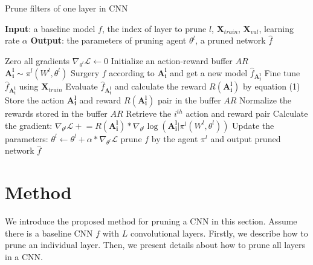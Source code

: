 \documentclass[10pt,twocolumn,letterpaper]{article}
\begin{document}
\begin{algorithm}[!ht]
  \caption{Prune filters of one layer in CNN}\label{algo1}
  \begin{algorithmic}
    
  \State \textbf{Input}: a baseline model $f$, the index of layer to prune $l$, $\mathbf{X}_{train}$, $\mathbf{X}_{val}$, learning rate $\alpha$
  \State \textbf{Output}: the parameters of pruning agent $\theta^l$, a pruned network $\hat{f}$
  
           \State Zero all gradients $\nabla_{\theta^l}\mathcal{L} \leftarrow 0 $
           \State Initialize an action-reward buffer $AR$
                                                                                   
               \State $\mathbf{A_i^l}  \sim \pi^l(W^l, \theta^l)$                                       
               \State Surgery $f$ according to $\mathbf{A_i^l} $ and get a new model $\hat{f}_{\mathbf{A_i^l} }$                 
               \State Fine tune $\hat{f}_{\mathbf{A_i^l} }$  using $\mathbf{X}_{train}$
               \State Evaluate $\hat{f}_{\mathbf{A_i^l} }$ and calculate the reward $R(\mathbf{A_i^l} )$ by equation (1)
               \State Store the action $\mathbf{A_i^l} $ and reward $R(\mathbf{A_i^l} )$ pair in the buffer $AR$
          \EndFor
          \State Normalize the rewards stored in the buffer $AR$
              \State Retrieve the $i^{th}$ action and reward pair
              \State Calculate the gradient: $\nabla_{\theta^l}\mathcal{L} \mathrel{+}= R(\mathbf{A_i^l} ) * \nabla_{\theta^l} \log(\mathbf{A_i^l}   | \pi^l(W^l,\theta^l))  $
          \EndFor      
        \State Update the parameters: $\theta^l \leftarrow \theta^l + \alpha * \nabla_{\theta^l}\mathcal{L}$
     \EndWhile
     \State prune $f$ by the agent $\pi^l$ and output pruned network $\hat{f}$
  \end{algorithmic}
\end{algorithm}



\section{Method}

We introduce the proposed method for pruning a CNN in this section. Assume there is a baseline CNN $f$ with $L$ convolutional layers. Firstly, we describe how to prune an individual layer. Then, we present details about how to prune all layers in a CNN.
\end{document}
